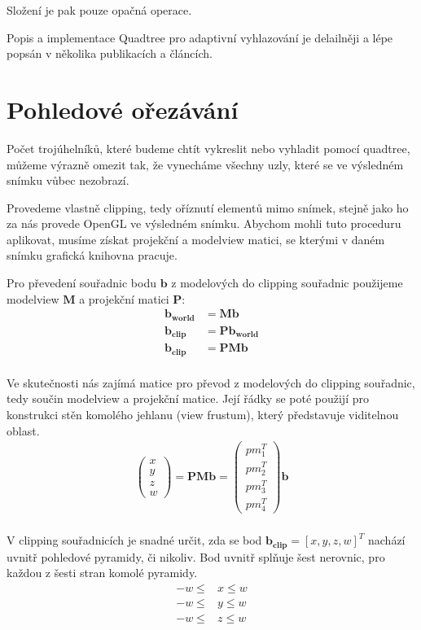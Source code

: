 \documentclass[11pt]{article}
\begin{document}
Složení je pak pouze opačná operace.

Popis a implementace Quadtree pro adaptivní vyhlazování je delailněji a lépe popsán v několika publikacích a článcích. %


\section{Pohledové ořezávání}
Počet trojúhelníků, které budeme chtít vykreslit nebo vyhladit pomocí quadtree, můžeme výrazně omezit tak, že vynecháme všechny uzly, které se ve výsledném snímku vůbec nezobrazí.

Provedeme vlastně clipping, tedy oříznutí elementů mimo snímek, stejně jako ho
za nás provede OpenGL ve výsledném snímku. Abychom mohli tuto proceduru
aplikovat, musíme získat projekční a modelview matici, se kterými v daném
snímku grafická knihovna pracuje.

Pro převedení souřadnic bodu $\mathbf{b}$ z modelových do clipping souřadnic
použijeme modelview $\mathbf{M}$ a projekční matici $\mathbf{P}$:
\begin{align*}
\mathbf{b_{world}} &= \mathbf{M} \mathbf{b} \\
\mathbf{b_{clip}} &= \mathbf{P} \mathbf{b_{world}} \\
\mathbf{b_{clip}} &= \mathbf{P} \mathbf{M} \mathbf{b} \\
\end{align*}

Ve skutečnosti nás zajímá matice pro převod z modelových do clipping souřadnic, tedy součin modelview a projekční matice. Její řádky se poté použijí pro konstrukci stěn komolého jehlanu (view frustum), který představuje viditelnou oblast.
\begin{align*}
\begin{pmatrix}x\\y\\z\\w\end{pmatrix} = \mathbf{PM} \mathbf{b} = \begin{pmatrix}pm_1^T\\pm_2^T\\pm_3^T\\pm_4^T\end{pmatrix} \mathbf{b}\\
\end{align*}

V clipping souřadnicích je snadné určit, zda se bod $\mathbf{b_{clip}} = \left[
x, y, z, w \right]^T$ nachází uvnitř pohledové pyramidy, či nikoliv. Bod uvnitř splňuje šest nerovnic, pro každou z šesti stran komolé pyramidy.
\begin{align*}
-w \leq & x \leq w \\
-w \leq & y \leq w \\
-w \leq & z \leq w \\
\end{align*}
\end{document}
